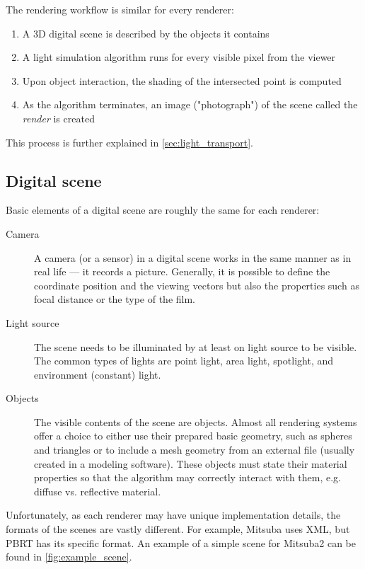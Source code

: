 The rendering workflow is similar for every renderer:
\begin{enumerate}
	\item A 3D digital scene is described by the objects it contains
	\item A light simulation algorithm runs for every visible pixel from the viewer
	\item Upon object interaction, the shading of the intersected point is computed
	\item As the algorithm terminates, an image ("photograph") of the scene called the \emph{render} is created
\end{enumerate}

This process is further explained in \autoref{sec:light_transport}.

\subsection{Digital scene}

Basic elements of a digital scene are roughly the same for each renderer:

\begin{description}
	\item[Camera] A camera (or a sensor) in a digital scene works in the same manner as in real life --- it records a picture. Generally, it is possible to define the coordinate position and the viewing vectors but also the properties such as focal distance or the type of the film.
	\item[Light source] The scene needs to be illuminated by at least on light source to be visible. The common types of lights are point light, area light, spotlight, and environment (constant) light. 
	\item[Objects] The visible contents of the scene are objects. Almost all rendering systems offer a choice to either use their prepared basic geometry, such as spheres and triangles or to include a mesh geometry from an external file (usually created in a modeling software). These objects must state their material properties so that the algorithm may correctly interact with them, e.g. diffuse vs. reflective material.
\end{description}

Unfortunately, as each renderer may have unique implementation details, the formats of the scenes are vastly different. For example, Mitsuba uses XML, but PBRT has its specific format. An example of a simple scene for Mitsuba2 can be found in \autoref{fig:example_scene}.

